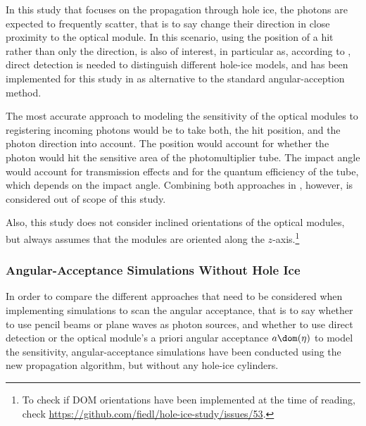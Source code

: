 In this study that focuses on the propagation through hole ice, the photons are expected to frequently scatter, that is to say change their direction in close proximity to the optical module. In this scenario, using the position of a hit rather than only the direction, is also of interest, in particular as, according to  \cite{martinspicehddard}, direct detection is needed to distinguish different hole-ice models, and has been implemented for this study in  as alternative to the standard angular-acception method.


The most accurate approach to modeling the sensitivity of the optical modules to registering incoming photons would be to take both, the hit position, and the photon direction into account. The position would account for whether the photon would hit the sensitive area of the photomultiplier tube. The impact angle would account for transmission effects and for the quantum efficiency of the tube, which depends on the impact angle. Combining both approaches in , however, is considered out of scope of this study.

Also, this study does not consider inclined orientations of the optical modules, but always assumes that the modules are oriented along the $z$-axis.\footnote{To check if DOM orientations have been implemented at the time of reading, check \url{https://github.com/fiedl/hole-ice-study/issues/53}.}



\subsubsection{Angular-Acceptance Simulations Without Hole Ice}
In order to compare the different approaches that need to be considered when implementing simulations to scan the angular acceptance, that is to say whether to use pencil beams or plane waves as photon sources, and whether to use direct detection or the optical module's a priori angular acceptance $a\dom(\eta)$ to model the sensitivity, angular-acceptance simulations have been conducted using the new propagation algorithm, but without any hole-ice cylinders.



